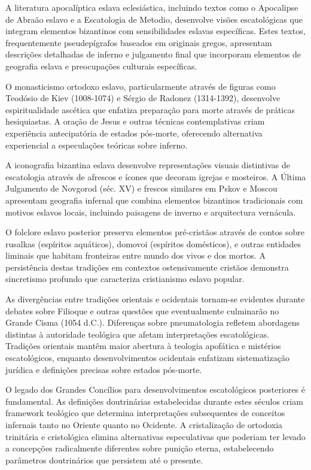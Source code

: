 A literatura apocalíptica eslava eclesiástica, incluindo textos como o Apocalipse de Abraão eslavo e a Escatologia de Metodio, desenvolve visões escatológicas que integram elementos bizantinos com sensibilidades eslavas específicas. Estes textos, frequentemente pseudepígrafos baseados em originais gregos, apresentam descrições detalhadas de inferno e julgamento final que incorporam elementos de geografia eslava e preocupações culturais específicas.

O monasticismo ortodoxo eslavo, particularmente através de figuras como Teodósio de Kiev (1008-1074) e Sérgio de Radonez (1314-1392), desenvolve espiritualidade ascética que enfatiza preparação para morte através de práticas hesiquiastas. A oração de Jesus e outras técnicas contemplativas criam experiência antecipatória de estados pós-morte, oferecendo alternativa experiencial a especulações teóricas sobre inferno.

A iconografia bizantina eslava desenvolve representações visuais distintivas de escatologia através de afrescos e ícones que decoram igrejas e mosteiros. A Última Julgamento de Novgorod (séc. XV) e frescos similares em Pskov e Moscou apresentam geografia infernal que combina elementos bizantinos tradicionais com motivos eslavos locais, incluindo paisagens de inverno e arquitectura vernácula.

O folclore eslavo posterior preserva elementos pré-cristãos através de contos sobre rusalkas (espíritos aquáticos), domovoi (espíritos domésticos), e outras entidades liminais que habitam fronteiras entre mundo dos vivos e dos mortos. A persistência destas tradições em contextos ostensivamente cristãos demonstra sincretismo profundo que caracteriza cristianismo eslavo popular.

As divergências entre tradições orientais e ocidentais tornam-se evidentes durante debates sobre Filioque e outras questões que eventualmente culminarão no Grande Cisma (1054 d.C.). Diferenças sobre pneumatologia refletem abordagens distintas à autoridade teológica que afetam interpretações escatológicas. Tradições orientais mantêm maior abertura à teologia apofática e mistérios escatológicos, enquanto desenvolvimentos ocidentais enfatizam sistematização jurídica e definições precisas sobre estados pós-morte.

O legado dos Grandes Concílios para desenvolvimentos escatológicos posteriores é fundamental. As definições doutrinárias estabelecidas durante estes séculos criam framework teológico que determina interpretações subsequentes de conceitos infernais tanto no Oriente quanto no Ocidente. A cristalização de ortodoxia trinitária e cristológica elimina alternativas especulativas que poderiam ter levado a concepções radicalmente diferentes sobre punição eterna, estabelecendo parâmetros doutrinários que persistem até o presente.
